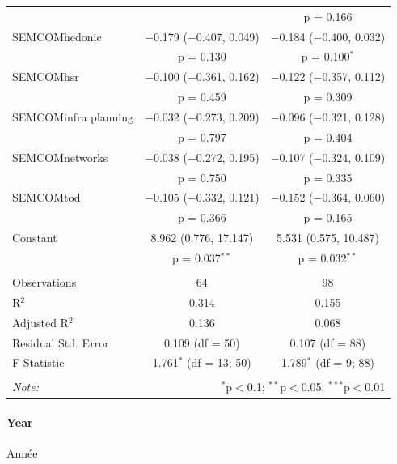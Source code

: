 \begin{table}[!htbp]
\begin{tabular}{@{\extracolsep{5pt}}lcc}
  &  & p = 0.166 \\ 
  SEMCOMhedonic & $-$0.179 ($-$0.407, 0.049) & $-$0.184 ($-$0.400, 0.032) \\ 
  & p = 0.130 & p = 0.100$^{*}$ \\ 
  SEMCOMhsr & $-$0.100 ($-$0.361, 0.162) & $-$0.122 ($-$0.357, 0.112) \\ 
  & p = 0.459 & p = 0.309 \\ 
  SEMCOMinfra planning & $-$0.032 ($-$0.273, 0.209) & $-$0.096 ($-$0.321, 0.128) \\ 
  & p = 0.797 & p = 0.404 \\ 
  SEMCOMnetworks & $-$0.038 ($-$0.272, 0.195) & $-$0.107 ($-$0.324, 0.109) \\ 
  & p = 0.750 & p = 0.335 \\ 
  SEMCOMtod & $-$0.105 ($-$0.332, 0.121) & $-$0.152 ($-$0.364, 0.060) \\ 
  & p = 0.366 & p = 0.165 \\ 
  Constant & 8.962 (0.776, 17.147) & 5.531 (0.575, 10.487) \\ 
  & p = 0.037$^{**}$ & p = 0.032$^{**}$ \\ 
 \hline \\[-1.8ex] 
Observations & 64 & 98 \\ 
R$^{2}$ & 0.314 & 0.155 \\ 
Adjusted R$^{2}$ & 0.136 & 0.068 \\ 
Residual Std. Error & 0.109 (df = 50) & 0.107 (df = 88) \\ 
F Statistic & 1.761$^{*}$ (df = 13; 50) & 1.789$^{*}$ (df = 9; 88) \\ 
\hline 
\hline \\[-1.8ex] 
\textit{Note:}  & \multicolumn{2}{r}{$^{*}$p$<$0.1; $^{**}$p$<$0.05; $^{***}$p$<$0.01} \\ 
\end{tabular} 
\end{table} 




\paragraph{Year}{Année}



